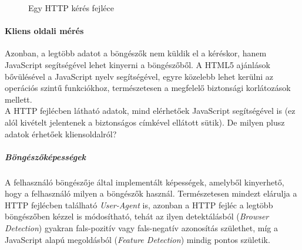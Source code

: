\begin{figure}[ht]
	\centering
		
		\caption{Egy HTTP kérés fejléce}
		\label{fig:request_header}
\end{figure}

\paragraph{Kliens oldali mérés} %
\label{par:kliens_oldali_mérés}

Azonban, a legtöbb adatot a böngészők nem küldik el a kéréskor, hanem JavaScript segítségével lehet kinyerni a böngészőből. A HTML5 ajánlások bővülésével a JavaScript nyelv segítségével, egyre közelebb lehet kerülni az operációs szintű funkciókhoz, természetesen a megfelelő biztonsági korlátozások mellett.\\

A HTTP fejlécben látható adatok, mind elérhetőek JavaScript segítségével is (ez alól kivételt jelentenek a biztonságos címkével ellátott sütik). De milyen plusz adatok érhetőek kliensoldalról?\hfill\\

\subparagraph{Böngészőképességek} %
\label{subp:bongeszokepessegek}
A felhasználó böngészője által implementált képességek, amelyből kinyerhető, hogy a felhasználó milyen a böngészők használ. Természetesen mindezt elárulja a HTTP fejlécben található \textit{User-Agent} is, azonban a HTTP fejléc a legtöbb böngészőben kézzel is módosítható, tehát az ilyen detektálásból (\textit{Browser Detection}) gyakran fals-pozitív vagy fals-negatív azonosítás születhet, míg a JavaScript alapú megoldásból (\textit{Feature Detection}) mindig pontos születik.

